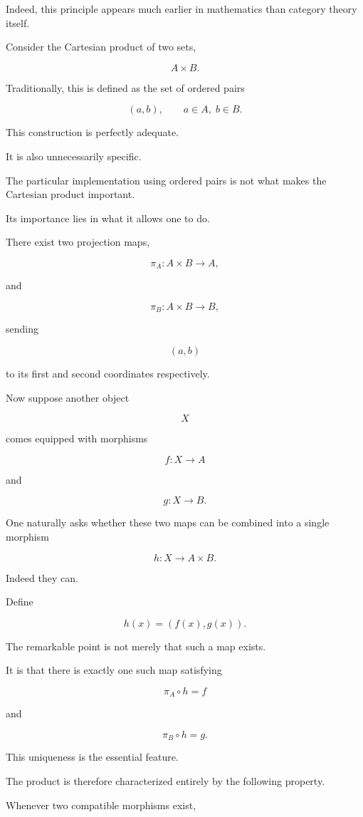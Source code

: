 \documentclass[11pt]{book}
\numberwithin{equation}{chapter}
\theoremstyle{definition}
\theoremstyle{plain}
\theoremstyle{remark}
\begin{document}
Indeed, this principle appears much earlier in mathematics than category theory itself.

Consider the Cartesian product of two sets,

\[
A\times B.
\]

Traditionally, this is defined as the set of ordered pairs

\[
(a,b),
\qquad
a\in A,\;
b\in B.
\]

This construction is perfectly adequate.

It is also unnecessarily specific.

The particular implementation using ordered pairs is not what makes the Cartesian product important.

Its importance lies in what it allows one to do.

There exist two projection maps,

\[
\pi_A:A\times B\rightarrow A,
\]

and

\[
\pi_B:A\times B\rightarrow B,
\]

sending

\[
(a,b)
\]

to its first and second coordinates respectively.

Now suppose another object

\[
X
\]

comes equipped with morphisms

\[
f:X\rightarrow A
\]

and

\[
g:X\rightarrow B.
\]

One naturally asks whether these two maps can be combined into a single morphism

\[
h:X\rightarrow A\times B.
\]

Indeed they can.

Define

\[
h(x)
=
(f(x),g(x)).
\]

The remarkable point is not merely that such a map exists.

It is that there is exactly one such map satisfying

\[
\pi_A\circ h=f
\]

and

\[
\pi_B\circ h=g.
\]

This uniqueness is the essential feature.

The product is therefore characterized entirely by the following property.

Whenever two compatible morphisms exist,
\end{document}
